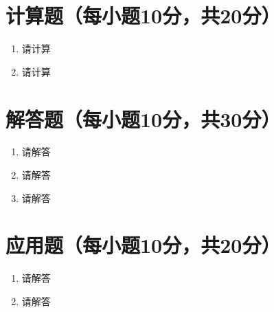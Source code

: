 \documentclass[oneside,AutoFakeBold=2.85]{article}
\begin{document}
\section{计算题（每小题10分，共20分）}

\begin{enumerate}
  \item
    请计算
    \vspace{8cm}
  \item
    请计算
\end{enumerate}

\clearpage

\section{解答题（每小题10分，共30分）}

\begin{enumerate}
  \item
    请解答
    \vfill
  \item
    请解答
    \vfill
  \item
    请解答
    \vfill
\end{enumerate}

\clearpage

\section{应用题（每小题10分，共20分）}

\begin{enumerate}
  \item
    请解答
    \vfill
  \item
    请解答
    \vfill
\end{enumerate}
\end{document}
